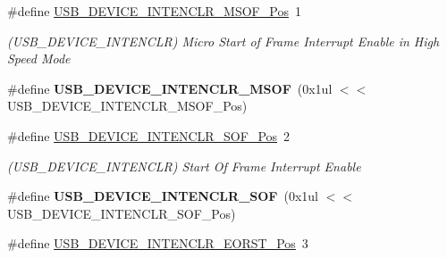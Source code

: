 \begin{DoxyCompactItemize}
\item 
\hypertarget{group___s_a_m_l21___u_s_b_gae9496824326381cab8d70f9017fb8ef8}{}\#define \hyperlink{group___s_a_m_l21___u_s_b_gae9496824326381cab8d70f9017fb8ef8}{U\+S\+B\+\_\+\+D\+E\+V\+I\+C\+E\+\_\+\+I\+N\+T\+E\+N\+C\+L\+R\+\_\+\+M\+S\+O\+F\+\_\+\+Pos}~1\label{group___s_a_m_l21___u_s_b_gae9496824326381cab8d70f9017fb8ef8}

\begin{DoxyCompactList}\small\item\em (U\+S\+B\+\_\+\+D\+E\+V\+I\+C\+E\+\_\+\+I\+N\+T\+E\+N\+C\+L\+R) Micro Start of Frame Interrupt Enable in High Speed Mode \end{DoxyCompactList}\item 
\hypertarget{group___s_a_m_l21___u_s_b_ga9eff57160b9e62f3abd7f16a31508b35}{}\#define {\bfseries U\+S\+B\+\_\+\+D\+E\+V\+I\+C\+E\+\_\+\+I\+N\+T\+E\+N\+C\+L\+R\+\_\+\+M\+S\+O\+F}~(0x1ul $<$$<$ U\+S\+B\+\_\+\+D\+E\+V\+I\+C\+E\+\_\+\+I\+N\+T\+E\+N\+C\+L\+R\+\_\+\+M\+S\+O\+F\+\_\+\+Pos)\label{group___s_a_m_l21___u_s_b_ga9eff57160b9e62f3abd7f16a31508b35}

\item 
\hypertarget{group___s_a_m_l21___u_s_b_ga556a6138ee0944f3e8b6140b53ea680a}{}\#define \hyperlink{group___s_a_m_l21___u_s_b_ga556a6138ee0944f3e8b6140b53ea680a}{U\+S\+B\+\_\+\+D\+E\+V\+I\+C\+E\+\_\+\+I\+N\+T\+E\+N\+C\+L\+R\+\_\+\+S\+O\+F\+\_\+\+Pos}~2\label{group___s_a_m_l21___u_s_b_ga556a6138ee0944f3e8b6140b53ea680a}

\begin{DoxyCompactList}\small\item\em (U\+S\+B\+\_\+\+D\+E\+V\+I\+C\+E\+\_\+\+I\+N\+T\+E\+N\+C\+L\+R) Start Of Frame Interrupt Enable \end{DoxyCompactList}\item 
\hypertarget{group___s_a_m_l21___u_s_b_ga19ea0ec7672bd28192f5ba0447fc7c29}{}\#define {\bfseries U\+S\+B\+\_\+\+D\+E\+V\+I\+C\+E\+\_\+\+I\+N\+T\+E\+N\+C\+L\+R\+\_\+\+S\+O\+F}~(0x1ul $<$$<$ U\+S\+B\+\_\+\+D\+E\+V\+I\+C\+E\+\_\+\+I\+N\+T\+E\+N\+C\+L\+R\+\_\+\+S\+O\+F\+\_\+\+Pos)\label{group___s_a_m_l21___u_s_b_ga19ea0ec7672bd28192f5ba0447fc7c29}

\item 
\hypertarget{group___s_a_m_l21___u_s_b_ga0d7b90ee2658b6546e2eba0a8ad82727}{}\#define \hyperlink{group___s_a_m_l21___u_s_b_ga0d7b90ee2658b6546e2eba0a8ad82727}{U\+S\+B\+\_\+\+D\+E\+V\+I\+C\+E\+\_\+\+I\+N\+T\+E\+N\+C\+L\+R\+\_\+\+E\+O\+R\+S\+T\+\_\+\+Pos}~3\label{group___s_a_m_l21___u_s_b_ga0d7b90ee2658b6546e2eba0a8ad82727}


\end{DoxyCompactItemize}
